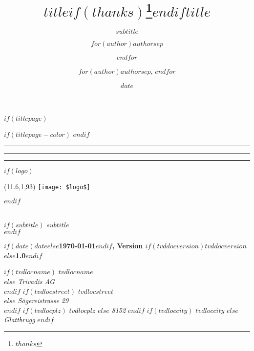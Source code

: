 \documentclass[$if(fontsize)$$fontsize$,$endif$$if(lang)$$babel-lang$,$endif$$if(papersize)$$papersize$paper,$else$a4paper,$endif$$if(beamer)$ignorenonframetext,$if(handout)$handout,$endif$$if(aspectratio)$aspectratio=$aspectratio$,$endif$$endif$$for(classoption)$$classoption$$sep$,$endfor$,tablecaptionabove]{$if(book)$scrbook$else$scrartcl$endif$}
\title{$title$$if(thanks)$\thanks{$thanks$}$endif$}
\subtitle{$subtitle$}
\author{$for(author)$$author$$sep$ \and $endfor$}
\institute{$for(institute)$$institute$$sep$ \and $endfor$}
\date{$date$}
\title{$title$}
\author{$for(author)$$author$$sep$, $endfor$}
\begin{document}
$if(titlepage)$
  \begin{titlepage}
  $if(titlepage-color)$
    \afterpage{\restorepagecolor}
  $endif$

  \begin{flushleft}
    \color{tvdred}\rule{2,5cm}{2,5cm} \hspace{2mm} \color{tvdgray}\rule{2,5cm}{2,5cm} \hspace{2mm} \rule{2,5cm}{2,5cm} 
  \end{flushleft}

  $if(logo)$
    \begin{textblock}{3}(11.6,1,93)
      \texttt{[image: \$logo\$]}
    \end{textblock}
  $endif$

  \begin{flushright}
    \vfill
    \\
    $if(subtitle)$
    \bigskip
    {\Large \textsf{$subtitle$}}\\
    $endif$

    \bigskip

    \begin{flushright}
      \textbf{ 
        $if(date)$$date$$else$\today$endif$,
        Version $if(tvddocversion)$$tvddocversion$$else$1.0$endif$ }\\
    \end{flushright}
    \vfill
  \end{flushright}

  \begin{flushright}
    $if(tvdlocname)$ \textit{$tvdlocname$\\}  $else$ \textit{Trivadis AG\\} $endif$
    $if(tvdlocstreet)$ \textit{$tvdlocstreet$\\}  $else$ \textit{Sägereistrasse 29\\} $endif$
    $if(tvdlocplz)$ \textit{$tvdlocplz$}  $else$ \textit{8152} $endif$
    $if(tvdloccity)$ \textit{$tvdloccity$}  $else$ \textit{Glattbrugg} $endif$
    \par
  \end{flushright}


\end{titlepage}
\end{document}
